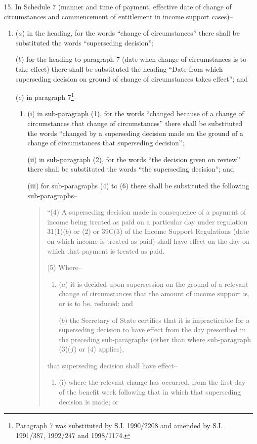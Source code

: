 \documentclass[12pt,a4paper]{article}
\begin{document}
15.  In Schedule 7 (manner and time of payment, effective date of change of circumstances and commencement of entitlement in income support cases)–
\begin{enumerate}\item[]
($a$) in the heading, for the words “change of circumstances” there shall be substituted the words “superseding decision”;

($b$) for the heading to paragraph 7 (date when change of circumstances is to take effect) there shall be substituted the heading “Date from which superseding decision on ground of change of circumstances takes effect”; and

($c$) in paragraph 7\footnote{\frenchspacing Paragraph 7 was substituted by S.I. 1990/2208 and amended by S.I. 1991/387, 1992/247 and 1998/1174.}–
\begin{enumerate}\item[]
(i) in sub-paragraph (1), for the words “changed because of a change of circumstances that change of circumstances” there shall be substituted the words “changed by a superseding decision made on the ground of a change of circumstances that superseding decision”;

(ii) in sub-paragraph (2), for the words “the decision given on review” there shall be substituted the words “the superseding decision”; and

(iii) for sub-paragraphs (4) to (6) there shall be substituted the following sub-paragraphs–
\begin{quotation}
“(4) A superseding decision made in consequence of a payment of income being treated as paid on a particular day under regulation 31(1)($b$)  or (2) or 39C(3) of the Income Support Regulations (date on which income is treated as paid) shall have effect on the day on which that payment is treated as paid.

(5) Where–
\begin{enumerate}\item[]
($a$) it is decided upon supersession on the ground of a relevant change of circumstances that the amount of income support is, or is to be, reduced; and

($b$) the Secretary of State certifies that it is impracticable for a superseding decision to have effect from the day prescribed in the preceding sub-paragraphs (other than where sub-paragraph (3)($f$)  or (4) applies),
\end{enumerate}
that superseding decision shall have effect–
\begin{enumerate}\item[]
(i) where the relevant change has occurred, from the first day of the benefit week following that in which that superseding decision is made; or


\end{enumerate}
\end{quotation}
\end{enumerate}
\end{enumerate}
\end{document}

